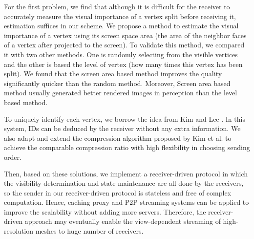     For the first problem, we find that although it is difficult
    for the receiver to accurately measure
    the visual importance of a vertex split before receiving it, 
    estimation suffices in our scheme. 
    We propose a method to estimate the visual importance of a vertex
    using its screen space area (the area of the neighbor faces
    of a vertex after projected to the screen).
    To validate this method, we compared it with two other
    methods. One is randomly selecting from the visible vertices and 
    the other is based the level of vertex (how many times this vertex
    has been split). We found that the screen area based method improves
    the quality significantly quicker than the random method. Moreover,
    Screen area based method usually generated better rendered images in perception
    than the level based method.
    
    To uniquely identify each vertex, we borrow the idea from Kim and Lee \cite{kim01truly}.
    In this system, IDs can be deduced by the receiver without any extra information. 
    We also adapt and extend the compression algorithm proposed by Kim et al. \cite{multiresolution:kim}
    to achieve the comparable compression ratio with high flexibility in choosing 
    sending order.
    
    Then, based on these solutions, we implement a receiver-driven protocol in which 
    the visibility determination and state maintenance are all done by the receivers, so 
    the sender in our receiver-driven protocol is stateless and free of complex computation.
    Hence, caching proxy and P2P streaming systems can be applied to improve
    the scalability without adding more servers.  
    Therefore, the receiver-driven approach may eventually
    enable the view-dependent streaming of high-resolution meshes to huge number of receivers.
    
